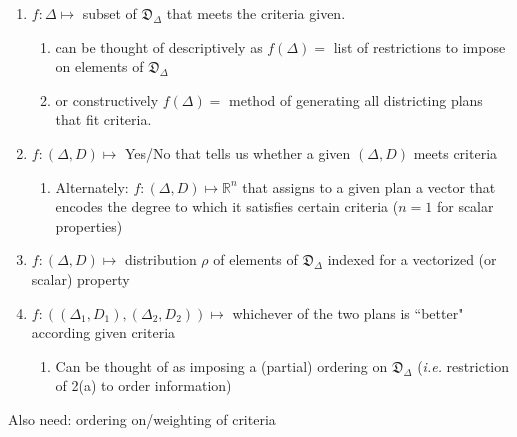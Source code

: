 \documentclass{article}
\newcommand{\Dd}{\mathfrak{D}_\Delta}
\newcommand{\R}{\mathbb{R}}
\begin{document}
\begin{enumerate}

	\item $f: \Delta \mapsto $ subset of $\Dd$ that meets the criteria given.
		\begin{enumerate}
			\item can be thought of descriptively as $f(\Delta) = $ list of restrictions to impose on elements of $\Dd$ 
			\item or constructively $f(\Delta) = $ method of generating all districting plans that fit criteria.
		\end{enumerate}
	\item $f: (\Delta, D) \mapsto$ Yes/No that tells us whether a given $(\Delta, D)$ meets criteria
		\begin{enumerate}
			\item Alternately:  $f: (\Delta, D) \mapsto \R^n $ that assigns to a given plan a vector that encodes the degree to which it satisfies certain criteria ($n = 1$ for scalar properties)
		\end{enumerate} 
	\item $f: (\Delta, D) \mapsto$ distribution $\rho$ of elements of $\Dd$ indexed for a vectorized  (or scalar) property
	\item $f: ( (\Delta_1, D_1), (\Delta_2, D_2) ) \mapsto $ whichever of the two plans is ``better" according given criteria
	\begin{enumerate}
			\item Can be thought of as imposing a (partial) ordering on $\Dd$ (\textit{i.e.} restriction of  2(a) to order information)
		\end{enumerate} 
		
\end{enumerate}


Also need: ordering on/weighting of criteria
\end{document}
